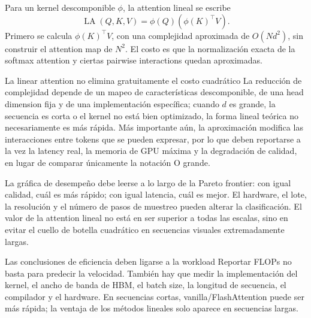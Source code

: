 
Para un kernel descomponible $\phi$, la attention lineal se escribe
\[
\operatorname{LA}(Q,K,V)
=\phi(Q)\left(\phi(K)^\top V\right).
\]
Primero se calcula $\phi(K)^\top V$, con una complejidad aproximada de $O(Nd^2)$, sin construir el attention map de $N^2$. El costo es que la normalización exacta de la softmax attention y ciertas pairwise interactions quedan aproximadas.

\begin{warningbox}{La linear attention no elimina gratuitamente el costo cuadrático}
La reducción de complejidad depende de un mapeo de características descomponible, de una head dimension fija y de una implementación específica; cuando $d$ es grande, la secuencia es corta o el kernel no está bien optimizado, la forma lineal teórica no necesariamente es más rápida. Más importante aún, la aproximación modifica las interacciones entre tokens que se pueden expresar, por lo que deben reportarse a la vez la latency real, la memoria de GPU máxima y la degradación de calidad, en lugar de comparar únicamente la notación O grande.
\end{warningbox}


La gráfica de desempeño debe leerse a lo largo de la Pareto frontier: con igual calidad, cuál es más rápido; con igual latencia, cuál es mejor. El hardware, el lote, la resolución y el número de pasos de muestreo pueden alterar la clasificación. El valor de la attention lineal no está en ser superior a todas las escalas, sino en evitar el cuello de botella cuadrático en secuencias visuales extremadamente largas.

\begin{importantbox}{Las conclusiones de eficiencia deben ligarse a la workload}
Reportar FLOPs no basta para predecir la velocidad. También hay que medir la implementación del kernel, el ancho de banda de HBM, el batch size, la longitud de secuencia, el compilador y el hardware. En secuencias cortas, vanilla/FlashAttention puede ser más rápida; la ventaja de los métodos lineales solo aparece en secuencias largas.
\end{importantbox}


